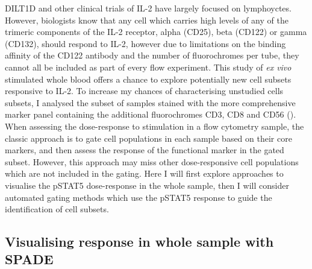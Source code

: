 DILT1D and other clinical trials of IL-2 have largely focused on lymphoyctes. %
However, biologists know that any cell which carries high levels of any of the trimeric components of the IL-2 receptor,
alpha (CD25), beta (CD122) or gamma (CD132), should respond to IL-2, however
due to limitations on the binding affinity of the CD122 antibody and the number of fluorochromes per tube,
they cannot all be included as part of every flow experiment.  
This study of \emph{ex vivo} stimulated whole blood offers a chance to explore potentially new cell subsets responsive to IL-2.
To increase my chances of characterising unstudied cells subsets, I analysed the subset of samples stained with the more comprehensive marker panel containing
the additional fluorochromes CD3, CD8 and CD56 ().
When assessing the dose-response to stimulation in a flow cytometry sample,
the classic approach is to gate cell populations in each sample based on their core markers,
and then assess the response of the functional marker in the gated subset.
However, this approach may miss other dose-responsive cell populations which are not included in the gating.
Here I will first explore approaches to visualise the pSTAT5 dose-response in the whole sample,
then I will consider automated gating methods which use the pSTAT5 response to guide the identification of cell subsets.


\subsection{Visualising response in whole sample with \acrfull{SPADE}}

